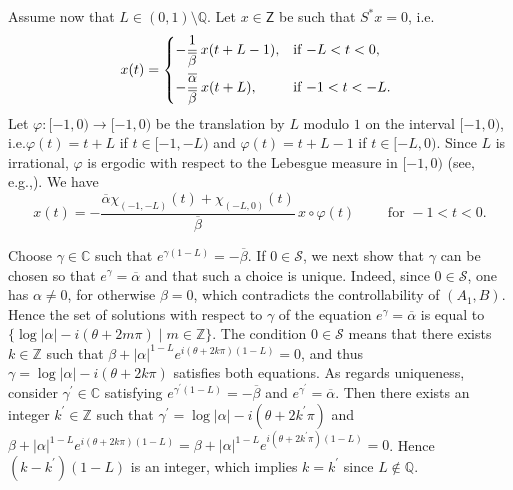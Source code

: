 \documentclass[10pt]{amsart}
\providecommand{\eg}{}
\renewcommand{\eg}{e.g.,\xspace}
\theoremstyle{plain}
\theoremstyle{definition}
\newcommand{\abs}[1]{\left\lvert #1\right \rvert}
\providecommand{\ie}{i.e.}\providecommand{\etc}{etc.}\providecommand{\resp}{resp.}\providecommand{\cf}{cf.}
\begin{document}
Assume now that $L \in (0, 1) \setminus \mathbb Q$. Let $x \in \mathsf Z$ be such that $S^\ast x = 0$, \ie 
\[
x(t) =
\begin{dcases*}
-\frac{1}{\overline\beta}\, x(t + L - 1), & if $-L < t < 0$, \\
-\frac{\overline\alpha}{\overline\beta}\, x(t + L), & if $-1 < t < -L$.
\end{dcases*}
\]
Let $\varphi: [-1, 0) \to [-1, 0)$ be the translation by $L$ modulo $1$ on the interval $[-1, 0)$, \ie $\varphi(t) = t + L$ if $t \in [-1, -L)$ and $\varphi(t) = t + L - 1$ if $t \in [-L, 0)$. Since $L$ is irrational, $\varphi$ is ergodic with respect to the Lebesgue measure in $[-1, 0)$ (see, \eg \cite[Chap.\,II, Th.\,3.2]{Mane1987Ergodic}). We have
\[
x(t) = -\frac{\overline\alpha \chi_{(-1, -L)}(t) + \chi_{(-L, 0)}(t)}{\overline\beta}\, x \circ \varphi(t) \qquad \text{ for } -1 < t < 0.
\]

Choose $\gamma \in \mathbb C$ such that $e^{\gamma (1 - L)} = -\overline\beta$. If $0 \in \mathcal S$, we next show that $\gamma$ can be chosen so that $e^{\gamma} = \overline\alpha$ and that such a choice is unique. Indeed, since $0 \in \mathcal S$, one has $\alpha \neq 0$, for otherwise $\beta = 0$, which contradicts the controllability of $(A_1, B)$. Hence the set of solutions with respect to $\gamma$ of the equation $e^{\gamma} = \overline\alpha$ is equal to $\{\log \abs{\alpha} - i (\theta + 2 m \pi) \mid m \in \mathbb Z\}$. The condition $0 \in \mathcal S$ means that there exists $k \in \mathbb Z$ such that $\beta + \abs{\alpha}^{1 - L} e^{i (\theta + 2 k \pi)(1 - L)} = 0$, and thus $\gamma = \log \abs{\alpha} - i (\theta + 2 k \pi)$ satisfies both equations. As regards uniqueness, consider $\gamma^\prime \in \mathbb C$ satisfying $e^{\gamma^\prime (1 - L)} = -\overline\beta$ and $e^{\gamma^\prime} = \overline\alpha$. Then there exists an integer $k^\prime \in \mathbb Z$ such that $\gamma^\prime = \log \abs{\alpha} - i (\theta + 2 k^\prime \pi)$ and $\beta + \abs{\alpha}^{1 - L} e^{i (\theta + 2 k \pi)(1 - L)} = \beta + \abs{\alpha}^{1 - L} e^{i (\theta + 2 k^\prime \pi)(1 - L)} = 0$. Hence $(k - k^\prime)(1 - L)$ is an integer, which implies $k = k^\prime$ since $L \notin \mathbb Q$.
\end{document}
